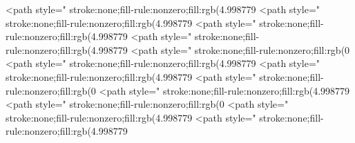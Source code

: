 <path style=" stroke:none;fill-rule:nonzero;fill:rgb(4.998779%
<path style=" stroke:none;fill-rule:nonzero;fill:rgb(4.998779%
<path style=" stroke:none;fill-rule:nonzero;fill:rgb(4.998779%
<path style=" stroke:none;fill-rule:nonzero;fill:rgb(4.998779%
<path style=" stroke:none;fill-rule:nonzero;fill:rgb(0%
<path style=" stroke:none;fill-rule:nonzero;fill:rgb(4.998779%
<path style=" stroke:none;fill-rule:nonzero;fill:rgb(4.998779%
<path style=" stroke:none;fill-rule:nonzero;fill:rgb(0%
<path style=" stroke:none;fill-rule:nonzero;fill:rgb(4.998779%
<path style=" stroke:none;fill-rule:nonzero;fill:rgb(0%
<path style=" stroke:none;fill-rule:nonzero;fill:rgb(4.998779%
<path style=" stroke:none;fill-rule:nonzero;fill:rgb(4.998779%
